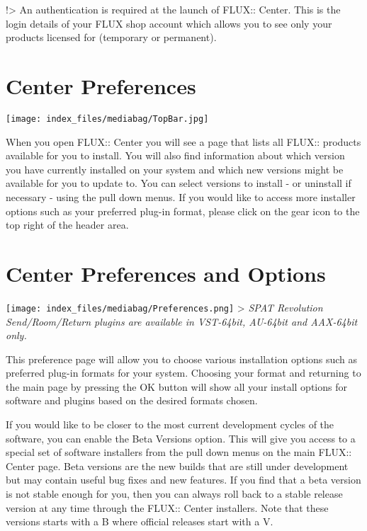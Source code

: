 \documentclass[
  letterpaper,
  DIV=11,
  numbers=noendperiod]{scrreport}
\begin{document}
!\textgreater{} An authentication is required at the launch of FLUX::
Center. This is the login details of your FLUX shop account which allows
you to see only your products licensed for (temporary or permanent).

\hypertarget{center-preferences}{%
\section{Center Preferences}\label{center-preferences}}

\texttt{[image: index\_files/mediabag/TopBar.jpg]}

When you open FLUX:: Center you will see a page that lists all FLUX::
products available for you to install. You will also find information
about which version you have currently installed on your system and
which new versions might be available for you to update to. You can
select versions to install - or uninstall if necessary - using the pull
down menus. If you would like to access more installer options such as
your preferred plug-in format, please click on the gear icon to the top
right of the header area.

\hypertarget{center-preferences-and-options}{%
\section{Center Preferences and
Options}\label{center-preferences-and-options}}

\texttt{[image: index\_files/mediabag/Preferences.png]} \textgreater{}
\emph{\emph{SPAT Revolution} Send/Room/Return plugins are available in
VST-64bit, AU-64bit and AAX-64bit only.}

This preference page will allow you to choose various installation
options such as preferred plug-in formats for your system. Choosing your
format and returning to the main page by pressing the OK button will
show all your install options for software and plugins based on the
desired formats chosen.

If you would like to be closer to the most current development cycles of
the software, you can enable the Beta Versions option. This will give
you access to a special set of software installers from the pull down
menus on the main FLUX:: Center page. Beta versions are the new builds
that are still under development but may contain useful bug fixes and
new features. If you find that a beta version is not stable enough for
you, then you can always roll back to a stable release version at any
time through the FLUX:: Center installers. Note that these versions
starts with a B where official releases start with a V.
\end{document}
